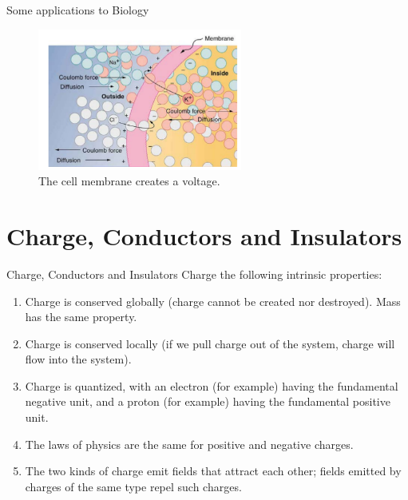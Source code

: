 \documentclass{beamer}
\begin{document}
\begin{frame}{Some applications to Biology}
\begin{figure}
\centering
\includegraphics[width=0.6\textwidth]{figures/membrane.png}
\caption{\label{fig:membrane} The cell membrane creates a voltage.}
\end{figure}
\end{frame}

\section{Charge, Conductors and Insulators}

\begin{frame}{Charge, Conductors and Insulators}
\small
Charge the following intrinsic properties: \\ \vspace{0.25cm}
\begin{enumerate}
\item Charge is conserved globally (charge cannot be created nor destroyed).  Mass has the same property.
\item Charge is conserved locally (if we pull charge out of the system, charge will flow into the system).
\item Charge is quantized, with an electron (for example) having the fundamental negative unit, and a proton (for example) having the fundamental positive unit.
\item The laws of physics are the same for positive and negative charges.
\item The two kinds of charge emit fields that attract each other; fields emitted by charges of the same type repel such charges.
\end{enumerate}
\end{frame}
\end{document}
